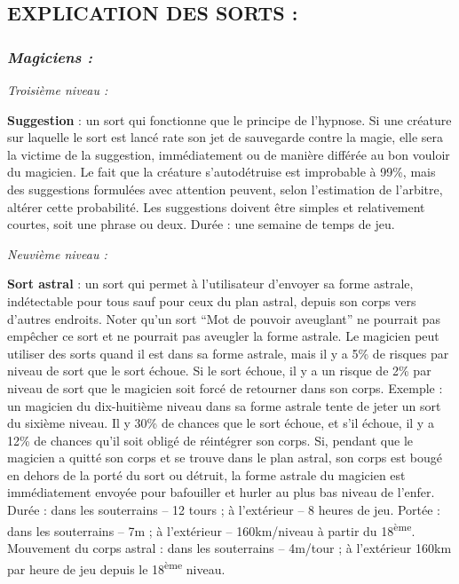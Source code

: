 \subsection*{EXPLICATION DES SORTS :}

\subsubsection*{\textit{Magiciens :}}

\textit{Troisième niveau :}

\bigskip

\label{sort-suggestion}\textbf{Suggestion} : un sort qui fonctionne que le principe de l'hypnose. Si une créature sur laquelle le sort est lancé rate son jet de sauvegarde contre la magie, elle sera la victime de la suggestion, immédiatement ou de manière différée au bon vouloir du magicien. Le fait que la créature s'autodétruise est improbable à 99\%, mais des suggestions formulées avec attention peuvent, selon l'estimation de l'arbitre, altérer cette probabilité. Les suggestions doivent être simples et relativement courtes, soit une phrase ou deux. Durée : une semaine de temps de jeu.

\bigskip

\textit{Neuvième niveau :}

\bigskip

\label{sort-astral}\textbf{Sort astral} : un sort qui permet à l'utilisateur d'envoyer sa forme astrale, indétectable pour tous sauf pour ceux du plan astral, depuis son corps vers d'autres endroits. Noter qu'un sort ``Mot de pouvoir aveuglant'' ne pourrait pas empêcher ce sort et ne pourrait pas aveugler la forme astrale. Le magicien peut utiliser des sorts quand il est dans sa forme astrale, mais il y a 5\% de risques par niveau de sort que le sort échoue. Si le sort échoue, il y a un risque de 2\% par niveau de sort que le magicien soit forcé de retourner dans son corps. Exemple : un magicien du dix-huitième niveau dans sa forme astrale tente de jeter un sort du sixième niveau. Il y  30\% de chances que le sort échoue, et s'il échoue, il y a 12\% de chances qu'il soit obligé de réintégrer son corps. Si, pendant que le magicien a quitté son corps et se trouve dans le plan astral, son corps est bougé en dehors de la porté du sort ou détruit, la forme astrale du magicien est immédiatement envoyée pour bafouiller et hurler au plus bas niveau de l'enfer. Durée : dans les souterrains -- 12 tours ; à l'extérieur -- 8 heures de jeu. Portée : dans les souterrains -- 7m ; à l'extérieur -- 160km/niveau à partir du 18\textsuperscript{ème}. Mouvement du corps astral : dans les souterrains -- 4m/tour ; à l'extérieur 160km par heure de jeu depuis le 18\textsuperscript{ème} niveau.


